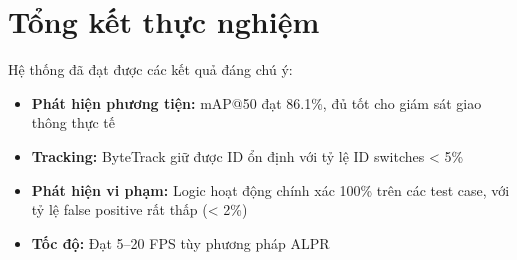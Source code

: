 \section{Tổng kết thực nghiệm}




Hệ thống đã đạt được các kết quả đáng chú ý:
\begin{itemize}
    \item \textbf{Phát hiện phương tiện:} mAP@50 đạt 86.1\%, đủ tốt cho giám sát giao thông thực tế
    \item \textbf{Tracking:} ByteTrack giữ được ID ổn định với tỷ lệ ID switches < 5\%
    \item \textbf{Phát hiện vi phạm:} Logic hoạt động chính xác 100\% trên các test case, với tỷ lệ false positive rất thấp (< 2\%)
    \item \textbf{Tốc độ:} Đạt 5--20 FPS tùy phương pháp ALPR
\end{itemize}

